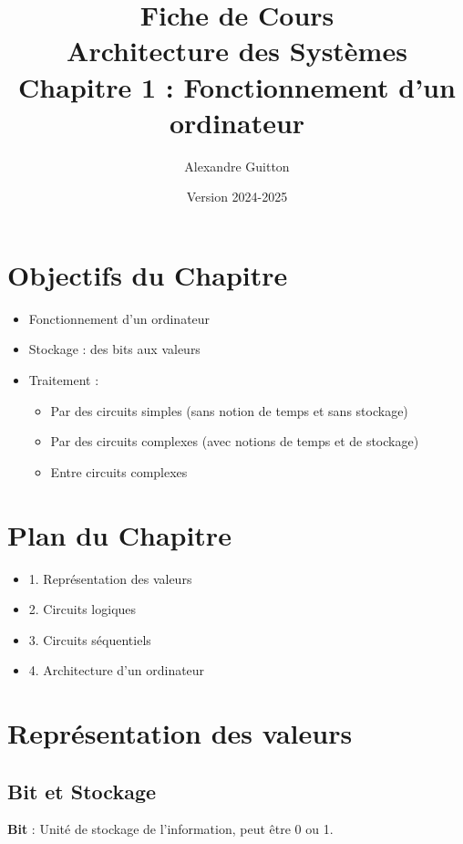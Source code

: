 \documentclass[12pt,a4paper]{article}
\title{\textbf{\Huge\color{titrebleu}Fiche de Cours}\\[0.5em]
\large\color{defvert}Architecture des Systèmes\\
Chapitre 1 : Fonctionnement d'un ordinateur}
\author{\large Alexandre Guitton}
\date{\large Version 2024-2025}
\begin{document}
\maketitle
\tableofcontents
\newpage

\section{Objectifs du Chapitre}
\begin{definition}
\begin{itemize}
    \item Fonctionnement d'un ordinateur
    \item Stockage : des bits aux valeurs
    \item Traitement :
    \begin{itemize}
        \item Par des circuits simples (sans notion de temps et sans stockage)
        \item Par des circuits complexes (avec notions de temps et de stockage)
        \item Entre circuits complexes
    \end{itemize}
\end{itemize}
\end{definition}

\section{Plan du Chapitre}
\begin{itemize}
    \item 1. Représentation des valeurs
    \item 2. Circuits logiques
    \item 3. Circuits séquentiels
    \item 4. Architecture d'un ordinateur
\end{itemize}

\newpage
\section{Représentation des valeurs}

\subsection{Bit et Stockage}
\begin{definition}
\textbf{Bit} : Unité de stockage de l'information, peut être 0 ou 1.
\end{definition}
\end{document}
